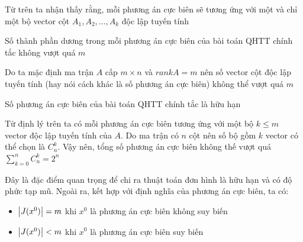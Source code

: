 \documentclass[12pt,a4paper]{article}\author{Nguyễn Nho Dũng}
\newcommand{\tonglanluot}[2]{\sum_{#1}^{#2}}
\begin{document}
\begin{nx}
	Từ trên ta nhận thấy rằng, mỗi phương án cực biên sẽ tương ứng với một và chỉ một bộ vector cột $A_1, A_2, \ldots, A_k$ độc lập tuyến tính
\end{nx}
\begin{hqua}
	Số thành phần dương trong mỗi phương án cực biên của bài toán QHTT chính tắc không vượt quá $m$
\end{hqua}
\begin{cm}
	Do ta mặc định ma trận $A$ cấp $m\times n$ và $rank A = m$ nên số vector cột độc lập tuyến tính (hay nói cách khác là số phương án cực biên) không thể vượt quá $m$ 
\end{cm}
\begin{hqua}
	Số phương án cực biên của bài toán QHTT chính tắc là hữu hạn
\end{hqua}
\begin{cm}
	Từ định lý trên ta có mỗi phương án cực biên tương ứng với một bộ $k\le m$ vector độc lập tuyến tính của $A$. Do ma trận có $n$ cột nên số bộ gồm $k$ vector có thể chọn là $C^k_n$. Vậy nên, tổng số phương án cực biên không thế vượt quá $\tonglanluot{k=0}{n}C^k_n = 2^n$
\end{cm}
\begin{nx}
	Đây là đặc điểm quan trọng để chi ra thuật toán đơn hình là hữu hạn và có độ phức tạp mũ. Ngoài ra, kết hợp với định nghĩa của phương án cực biên, ta có:
	\begin{itemize}
		\item $\abs{J(x^0)} = m$ khi $x^0$ là phương án cực biên không suy biến
		\item $\abs{J(x^0)} < m$ khi $x^0$ là phương án cực biên suy biến
	\end{itemize}
\end{nx}
\end{document}
